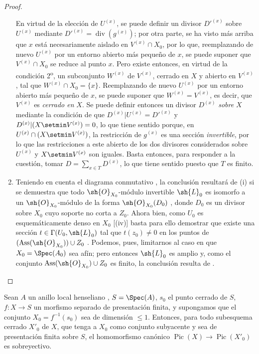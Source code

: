 \begin{proof}
\begin{enumerate}[label=(\roman*)]
En virtud de la elección de $U^{(x)}$, se puede definir un divisor $D'^{(x)}$ sobre $U^{(x)}$ mediante $D'^{(x)}=\operatorname{div}(g^{(x)})$;
por otra parte, se ha visto más arriba que $x$ está necesariamente aislado en $V^{(x)}\cap X_0$, por lo que, reemplazando de nuevo $U^{(x)}$ por un entorno abierto más pequeño de $x$, se puede suponer que $V^{(x)}\cap X_0$ se reduce al punto $x$.
Pero existe entonces, en virtud de la condición 2\textsuperscript{o}, un subconjunto $W^{(x)}$ de $V^{(x)}$, cerrado en $X$ y abierto en $V^{(x)}$, tal que $W^{(x)}\cap X_0=\{x\}$.
Reemplazando de nuevo $U^{(x)}$ por un entorno abierto más pequeño de $x$, se puede suponer
que $W^{(x)}=V^{(x)}$, es decir, que $V^{(x)}$ es \emph{cerrado en} $X$.
Se puede definir entonces un divisor $D^{(x)}$ \emph{sobre} $X$ mediante la condición de que $D^{(x)}|U^{(x)}=D'^{(x)}$ y $D^{(x)}|(X\setmin V^{(x)})=0$, lo que tiene sentido porque, en $U^{(x)}\cap(X\setmin V^{(x)})$, la restricción de $g^{(x)}$ es una sección \emph{invertible}, por lo que las restricciones a este abierto de los dos divisores considerados sobre $U^{(x)}$ y $X\setmin V^{(x)}$ son iguales.
Basta entonces, para responder a la cuestión, tomar $D=\sum_{x\in T}D^{(x)}$, lo que tiene sentido puesto que $T$ es finito.

  \item Teniendo en cuenta el diagrama conmutativo , la conclusión resultará de (i) si se demuestra que todo $\sh{O}_{X_0}$-módulo invertible $\sh{L}_0$ es isomorfo a un $\sh{O}_{X_0}$-módulo de la forma $\sh{O}_{X_0}(D_0)$ , donde $D_0$ es un divisor sobre $X_0$ cuyo soporte no corta a $Z_0$.
Ahora bien, como $U_0$ es esquemáticamente denso en $X_0$ [(iv)] basta para ello demostrar que existe una sección $t\in\Gamma(U_0,\sh{L}_0)$ tal que $t(z_0)\neq0$ en los puntos de $(\operatorname{Ass}(\sh{O}_{X_0}))\cup Z_0$ .
Podemos, pues, limitarnos al caso en que $X_0=\Spec(A_0)$ sea afín;
pero entonces $\sh{L}_0$ es amplio  y, como el conjunto $\operatorname{Ass}(\sh{O}_{X_0})\cup Z_0$ es finito, la conclusión resulta de .
\end{enumerate}
\end{proof}

\begin{corollary}[21.9.12]
\label{IV.21.9.12}
Sean $A$ un anillo local henseliano , $S=\Spec(A)$, $s_0$ el punto cerrado de $S$, $f:X\to S$ un morfismo separado de presentación finita, y supongamos que el conjunto $X_0=f^{-1}(s_0)$ sea de dimensión $\leq1$.
Entonces, para todo subesquema cerrado $X'_0$ de $X$, que tenga a $X_0$ como conjunto subyacente y sea de presentación finita sobre $S$, el homomorfismo canónico  $\operatorname{Pic}(X)\to\operatorname{Pic}(X'_0)$ es sobreyectivo.
\end{corollary}

